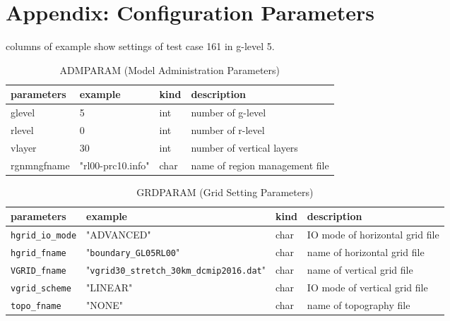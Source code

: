 \section{Appendix: Configuration Parameters}

 columns of example show settings of test case 161 in g-level 5.

\begin{table}[htb]
\begin{center}
\caption{ADMPARAM (Model Administration Parameters)}
\begin{tabularx}{150mm}{|l|l|l|X|} \hline
 \rowcolor[gray]{0.9} parameters & example & kind & description          \\ \hline
 glevel      & 5                 & int  & number of g-level              \\ \hline
 rlevel      & 0                 & int  & number of r-level              \\ \hline
 vlayer      & 30                & int  & number of vertical layers      \\ \hline
 rgnmngfname & "rl00-prc10.info" & char & name of region management file \\ \hline
\end{tabularx}
\end{center}
\end{table}

\begin{table}[htb]
\begin{center}
\caption{GRDPARAM (Grid Setting Parameters)}
\begin{tabularx}{150mm}{|l|l|l|X|} \hline
 \rowcolor[gray]{0.9} parameters & example & kind & description      \\ \hline
 \verb|hgrid_io_mode| & "ADVANCED" & char & IO mode of horizontal grid file \\ \hline
 \verb|hgrid_fname|   & "\verb|boundary_GL05RL00|"                  & char & name of horizontal grid file \\ \hline
 \verb|VGRID_fname|   & "\verb|vgrid30_stretch_30km_dcmip2016.dat|" & char & name of vertical grid file \\ \hline
 \verb|vgrid_scheme|  & "LINEAR"   & char & IO mode of vertical grid file   \\ \hline
 \verb|topo_fname|    & "NONE"     & char & name of topography file         \\ \hline
\end{tabularx}
\end{center}
\end{table}

